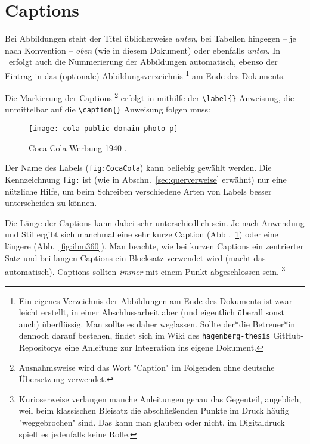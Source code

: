 \section{Captions}

Bei Abbildungen steht der Titel üblicherweise \emph{unten}, bei Tabellen
hingegen -- je nach Konvention -- \emph{oben} (wie in diesem Dokument) oder
ebenfalls \emph{unten}. In \latex\ erfolgt auch die Nummerierung der
Abbildungen automatisch, ebenso der Eintrag in das (optionale)
Abbildungsverzeichnis%
\footnote{Ein eigenes Verzeichnis der Abbildungen am Ende des Dokuments ist
zwar leicht erstellt, in einer Abschlussarbeit aber (und eigentlich überall
sonst auch) überflüssig. Man sollte es daher weglassen. Sollte der*die
Betreuer*in dennoch darauf bestehen, findet sich im Wiki des
\texttt{hagenberg-thesis} GitHub-Repositorys eine Anleitung zur Integration ins
eigene Dokument.} am Ende des Dokuments.

Die Markierung der Captions%
\footnote{Ausnahmsweise wird das Wort "Caption" im Folgenden ohne deutsche
	Übersetzung verwendet.}
erfolgt in \latex mithilfe der \verb!\label{}! Anweisung, die unmittelbar auf
die \verb!\caption{}! Anweisung folgen muss:
%
\begin{LaTeXCode}[numbers=none]
\begin{figure}
	\centering
	\texttt{[image: cola-public-domain-photo-p]}
	\caption{Coca-Cola Werbung 1940 \cite{CocaCola1940}.}
	\label{fig:CocaCola}
\end{figure}
\end{LaTeXCode}
%
Der Name des Labels (\texttt{fig:CocaCola}) kann beliebig gewählt werden. Die
Kennzeichnung \texttt{fig:} ist (wie in Abschn.\ \ref{sec:querverweise}
erwähnt) nur eine nützliche Hilfe, um beim Schreiben verschiedene Arten von
Labels besser unterscheiden zu können.

Die Länge der Captions kann dabei sehr unterschiedlich sein. Je nach
Anwendung und Stil ergibt sich manchmal eine sehr kurze Caption
(Abb .~\ref{fig:CocaCola}) oder eine längere (Abb.~\ref{fig:ibm360}).
Man beachte, wie bei kurzen Captions ein zentrierter Satz und bei langen
Captions ein Blocksatz verwendet wird (\latex macht das automatisch).
Captions sollten \emph{immer} mit einem Punkt abgeschlossen sein.%
\footnote{Kurioserweise verlangen manche Anleitungen genau das Gegenteil,
	angeblich, weil beim klassischen Bleisatz die abschließenden Punkte im
	Druck häufig "weggebrochen" sind. Das kann man glauben oder nicht, im
	Digitaldruck spielt es jedenfalls keine Rolle.}

